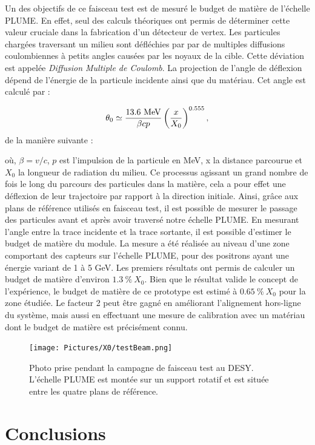   Un des objectifs de ce faisceau test est de mesuré le budget de matière de l'échelle PLUME.
  En effet, seul des calculs théoriques ont permis de déterminer cette valeur cruciale dans la fabrication d'un détecteur de vertex.
  Les particules chargées traversant un milieu sont défléchies par par de multiples diffusions coulombiennes à petits angles causées par les noyaux de la cible.
  Cette déviation est appelée \textit{Diffusion Multiple de Coulomb}.
  La projection de l'angle de déflexion dépend de l'énergie de la particule incidente ainsi que du matériau.
  Cet angle est calculé par :

  \begin{equation}
    \theta_0 \simeq \frac{13.6~\rm{MeV}}{\beta c p} \left(\frac{x}{X_0}\right)^{0.555},
  \end{equation}de la manière suivante : 

  où, $\beta = v/c$, $p$ est l’impulsion de la particule en MeV, x la distance parcourue et $X_0$ la longueur de radiation du milieu.
  Ce processus agissant un grand nombre de fois le long du parcours des particules dans la matière, cela a pour effet une déflexion de leur trajectoire par rapport à la direction initiale.
  Ainsi, grâce aux plans de référence utilisés en faisceau test, il est possible de mesurer le passage des particules avant et après avoir traversé notre échelle PLUME.
  En mesurant l'angle entre la trace incidente et la trace sortante, il est possible d'estimer le budget de matière du module.
  La mesure a été réalisée au niveau d'une zone comportant des capteurs sur l'échelle PLUME, pour des positrons ayant une énergie variant de 1 à 5 GeV.
  Les premiers résultats ont permis de calculer un budget de matière d'environ $1.3~\%~X_0$.
  Bien que le résultat valide le concept de l'expérience, le budget de matière de ce prototype est estimé à $0.65~\%~X_0$ pour la zone étudiée.
  Le facteur 2 peut être gagné en améliorant l'alignement hors-ligne du système, mais aussi en effectuant une mesure de calibration avec un matériau dont le budget de matière est précisément connu.  

  \begin{figure}
    \centering
    \texttt{[image: Pictures/X0/testBeam.png]}
    \caption{Photo prise pendant la campagne de faisceau test au DESY. L'échelle PLUME est montée sur un support rotatif et est située entre les quatre plans de référence.}
    \label{fig:testBeam}
  \end{figure}

  \section{Conclusions}
 
